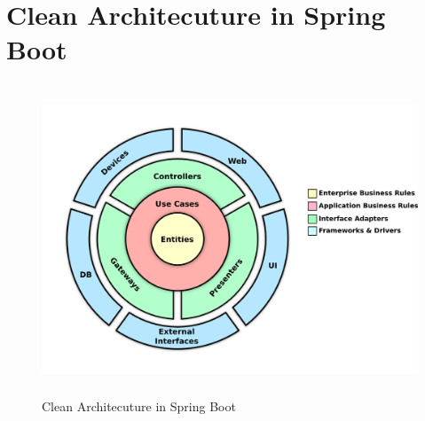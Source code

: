%	
%

\section{Clean Architecuture in Spring Boot} \label{a.2.cleanArchitecture}
\begin{figure}[h]
	\centering
	\includegraphics[height=350px]{./zfiles/Bilder/cleanArchitecture.png}
	\caption{Clean Architecuture in Spring Boot \cite{cleanArchitecture.medium}}
	\label{a.2.cleanArchitecture}
\end{figure}

